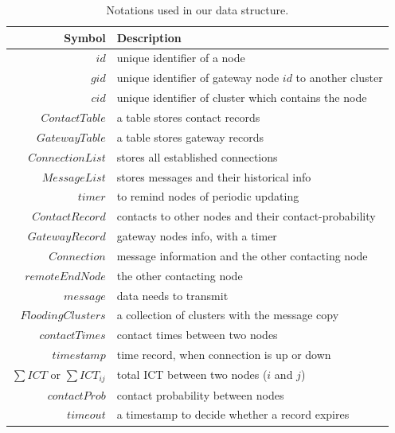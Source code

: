 \documentclass[conference]{IEEEtran}
\begin{document}
\begin{table}[!h]
    \caption{Notations used in our data structure.}\label{detal_data_structure}
    \vspace{.1in}
    \begin{tabular}[c]{r|l}
    \hline
    \textbf{Symbol} & \textbf{Description} \\
    \hline
    $id$ & unique identifier of a node\\
    $gid$ & unique identifier of gateway node $id$ to another cluster\\
    $cid$ & unique identifier of cluster which contains the node\\
    $ContactTable$ & a table stores contact records\\
    $GatewayTable$ & a table stores gateway records\\
    $ConnectionList$& stores all established connections\\
    $MessageList$ & stores messages and their historical info\\
    $timer$ & to remind nodes of periodic updating\\
   \hline
    $ContactRecord$  & contacts to other nodes and their contact-probability\\
    $GatewayRecord$ & gateway nodes info, with a timer\\
    $Connection$ & message information and the other contacting node\\
    $remoteEndNode$ & the other contacting node\\
    $message$ & data needs to transmit\\
    $FloodingClusters$ & a collection of clusters with the message copy\\
    $contactTimes$ & contact times between two nodes\\
    $timestamp$ & time record, when connection is up or down\\
    $\sum ICT$ or $\sum ICT_{ij}$ & total ICT between two nodes ($i$ and $j$)\\
    $contactProb$ & contact probability between nodes\\
    $timeout$ & a timestamp to decide whether a record expires\\
    \hline
    \end{tabular}
\end{table}
\end{document}
